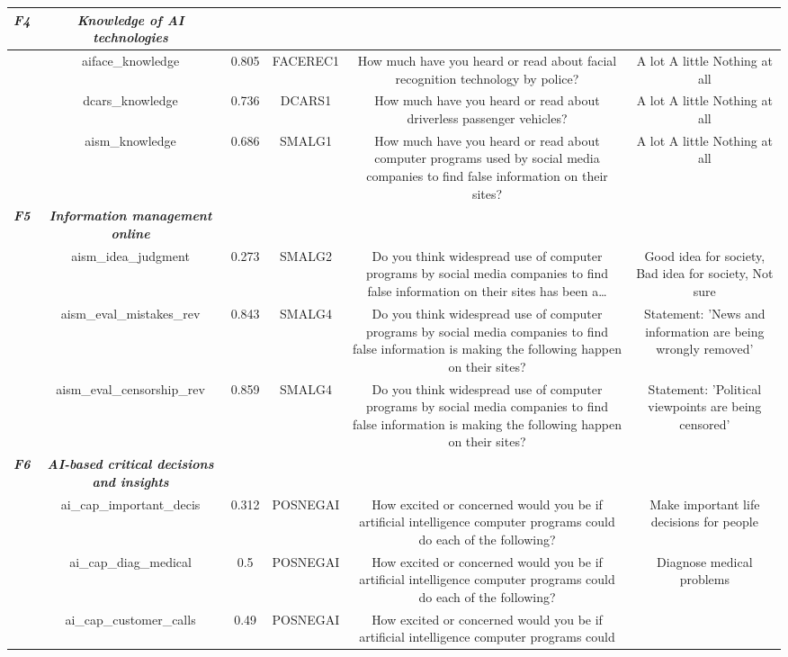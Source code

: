 {\begin{tabular}{c | c | c | c | c | c}
  \hline
  \textit{\textbf{F4}} & \textit{\textbf{Knowledge of AI technologies }} \\
  \hline
   & aiface\_knowledge & 0.805 & FACEREC1 & How much have you heard or read about facial recognition technology by police? & A lot
 A little
 Nothing at all \\
  \hline
   & dcars\_knowledge & 0.736 & DCARS1 & How much have you heard or read about driverless passenger vehicles? & A lot
 A little
 Nothing at all \\
  \hline
  \textit{ } & aism\_knowledge & 0.686 & SMALG1 & How much have you heard or read about computer programs used by social media companies to find false information on their sites? & A lot
 A little
 Nothing at all \\
  \hline
  \textit{\textbf{F5}} & \textit{\textbf{Information management online }} \\
  \hline
   & aism\_idea\_judgment & 0.273 & SMALG2 & Do you think widespread use of computer programs by social media companies to find false information on their sites has been a… & Good idea for society, Bad idea for society, Not sure \\
  \hline
   & aism\_eval\_mistakes\_rev & 0.843 & SMALG4 & Do you think widespread use of computer programs by social media companies to find false information is making the following happen on their sites? & Statement:  'News and information are being wrongly removed' \\
  \hline
  \textit{ } & aism\_eval\_censorship\_rev & 0.859 & SMALG4 & Do you think widespread use of computer programs by social media companies to find false information is making the following happen on their sites? & Statement:  'Political viewpoints are being censored' \\
  \hline
  \textit{\textbf{F6}} & \textit{\textbf{AI-based critical decisions and insights}} \\
  \hline
   & ai\_cap\_important\_decis & 0.312 & POSNEGAI & How excited or concerned would you be if artificial intelligence computer programs could
do each of the following? & Make important life decisions for people \\
  \hline
   & ai\_cap\_diag\_medical & 0.5 & POSNEGAI & How excited or concerned would you be if artificial intelligence computer programs could
do each of the following? & Diagnose medical problems \\
  \hline
   & ai\_cap\_customer\_calls & 0.49 & POSNEGAI & How excited or concerned would you be if artificial intelligence computer programs could

\end{tabular}}
